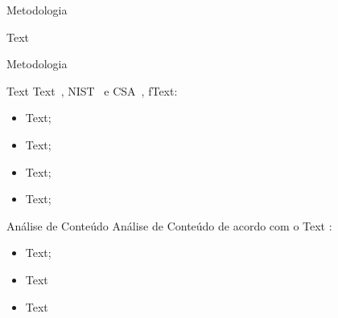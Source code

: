 \documentclass[8pt,aspectratio = 1610]{beamer}
\begin{document}
% 

\begin{frame}{Metodologia}{}
     \begin{block} {Text}
     
          
          \end{block}
\end{frame}

\begin{frame}{Metodologia}{}
     \begin{block} {Text}
      \vspace{5pt} 
            Text~\cite{enisa2012}, NIST~\cite{Jansen2011} e CSA~\cite{CloudSecurityAlliance2017}, fText:
            \begin{itemize}
            \item Text;
            \item Text;
            \item Text;
            \item Text;
            \end{itemize}
     \end{block}
     \begin{block}{Análise de Conteúdo}
        \vspace{5pt} 
    Análise de Conteúdo de acordo com o Text \cite{Bardin}:
       \begin{itemize}
            \item Text;
           \item Text
           \item Text
       \end{itemize}
     \end{block}
\end{frame}
\end{document}
